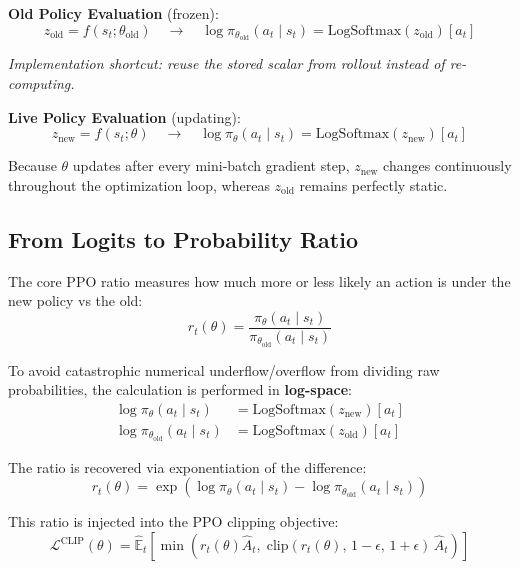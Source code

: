 \textbf{Old Policy Evaluation} (frozen): 
\begin{equation}
z_{\text{old}} = f(s_t; \theta_{\text{old}}) \quad \longrightarrow \quad \log \pi_{\theta_{\text{old}}}(a_t \mid s_t) = \text{LogSoftmax}(z_{\text{old}})[a_t]
\end{equation}

\emph{Implementation shortcut: reuse the stored scalar from rollout instead of re-computing.}

\textbf{Live Policy Evaluation} (updating): 
\begin{equation}
z_{\text{new}} = f(s_t; \theta) \quad \longrightarrow \quad \log \pi_\theta(a_t \mid s_t) = \text{LogSoftmax}(z_{\text{new}})[a_t]
\end{equation}

Because $\theta$ updates after every mini-batch gradient step, $z_{\text{new}}$ changes continuously throughout the optimization loop, whereas $z_{\text{old}}$ remains perfectly static.

\subsection{From Logits to Probability Ratio}
\label{from-logits-to-probability-ratio}

The core PPO ratio measures how much more or less likely an action is under the new policy vs the old: 
\begin{equation}
\boxed{r_t(\theta) = \frac{\pi_\theta(a_t \mid s_t)}{\pi_{\theta_{\text{old}}}(a_t \mid s_t)}}
\end{equation}

To avoid catastrophic numerical underflow/overflow from dividing raw probabilities, the calculation is performed in \textbf{log-space}: 
\begin{align}
\log \pi_\theta(a_t \mid s_t) &= \text{LogSoftmax}(z_{\text{new}})[a_t] \\
\log \pi_{\theta_{\text{old}}}(a_t \mid s_t) &= \text{LogSoftmax}(z_{\text{old}})[a_t]
\end{align}

The ratio is recovered via exponentiation of the difference: 
\begin{equation}
\boxed{r_t(\theta) = \exp\!\left(\log \pi_\theta(a_t \mid s_t) - \log \pi_{\theta_{\text{old}}}(a_t \mid s_t)\right)}
\end{equation}

This ratio is injected into the PPO clipping objective: 
\begin{equation}
\boxed{\mathcal{L}^{\text{CLIP}}(\theta) = \hat{\mathbb{E}}_t \left[ \min\!\left(r_t(\theta)\hat{A}_t, \;\text{clip}(r_t(\theta),\, 1{-}\epsilon,\, 1{+}\epsilon)\,\hat{A}_t\right) \right]}
\end{equation}


